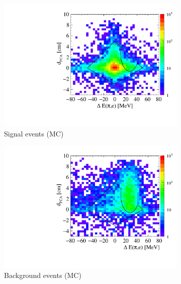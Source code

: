 \begin{figure}[h!]
  \centering
\captionsetup[subfigure]{justification=centering}
  \begin{subfigure}{0.45\textwidth}
    \includegraphics[width=1.0\textwidth]{Chapter7_analysis_kloe/img/dpca_de_signal}
    \caption{Signal events (MC)}
  \end{subfigure}
  \begin{subfigure}{0.45\textwidth}
    \includegraphics[width=1.0\textwidth]{Chapter7_analysis_kloe/img/dpca_de_background}
    \caption{Background events (MC)}
  \end{subfigure}
  \begin{subfigure}{0.45\textwidth}

\end{subfigure}
\end{figure}
